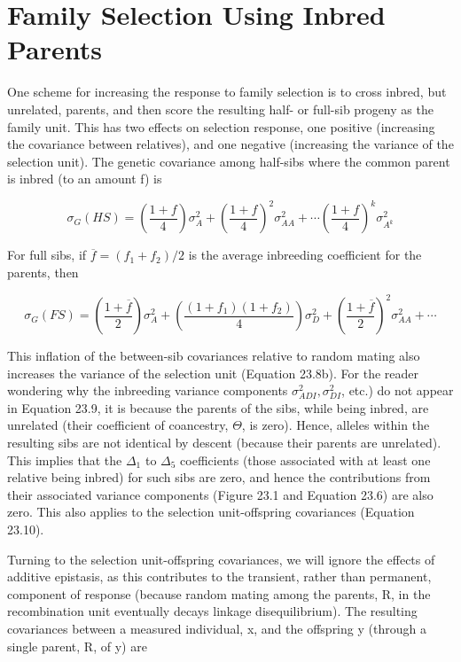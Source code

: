 \documentclass{article}
\begin{document}
\section{Family Selection Using Inbred Parents}
One scheme for increasing the response to family selection is to cross inbred, but unrelated, parents, and then score the resulting half- or full-sib progeny as the family unit. This has two effects on selection response, one positive (increasing the covariance between relatives), and one negative (increasing the variance of the selection unit). The genetic covariance among half-sibs where the common parent is inbred (to an amount f) is

\begin{equation}
\sigma_{G}(H S)=\left(\frac{1+f}{4}\right)\sigma_{A}^{2}+\left(\frac{1+f}{4}\right)^{2}\sigma_{A A}^{2}+\cdots\left(\frac{1+f}{4}\right)^{k}\sigma_{A^{k}}^{2}
\tag{23.9a}
\label{eq:23_9a}
\end{equation}

For full sibs, if  $ \overline{f} = (f_1 + f_2)/2 $ is the average inbreeding coefficient for the parents, then

\begin{equation}
\sigma_{G}(FS)=\left(\frac{1+\overline{f}}{2}\right)\sigma_{A}^{2}+\left(\frac{(1+f_{1})(1+f_{2})}{4}\right)\sigma_{D}^{2}+\left(\frac{1+\overline{f}}{2}\right)^{2}\sigma_{A A}^{2}+\cdots
\tag{23.9b}
\label{eq:23_9b}
\end{equation}

This inflation of the between-sib covariances relative to random mating also increases the variance of the selection unit (Equation 23.8b). For the reader wondering why the inbreeding variance components  $ \sigma_{ADI}^{2}, \sigma_{DI}^{2} $, etc.) do not appear in Equation 23.9, it is because the parents of the sibs, while being inbred, are unrelated (their coefficient of coancestry,  $ \Theta $, is zero). Hence, alleles within the resulting sibs are not identical by descent (because their parents are unrelated). This implies that the  $ \Delta_{1} $ to  $ \Delta_{5} $ coefficients (those associated with at least one relative being inbred) for such sibs are zero, and hence the contributions from their associated variance components (Figure 23.1 and Equation 23.6) are also zero. This also applies to the selection unit-offspring covariances (Equation 23.10).

Turning to the selection unit-offspring covariances, we will ignore the effects of additive epistasis, as this contributes to the transient, rather than permanent, component of response (because random mating among the parents, R, in the recombination unit eventually decays linkage disequilibrium). The resulting covariances between a measured individual, x, and the offspring y (through a single parent, R, of y) are
\end{document}
